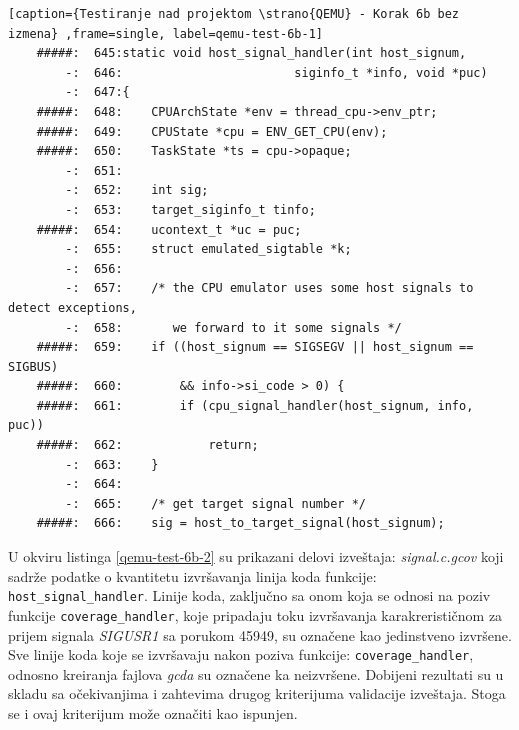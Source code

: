 \documentclass[12pt,oneside]{memoir}
\newcommand{\kod}[1]{\texttt{#1}}
\newcommand{\strano}[1]{\textit{#1}}
\begin{document}
\begin{lstlisting}[caption={Testiranje nad projektom \strano{QEMU} - Korak 6b bez izmena} ,frame=single, label=qemu-test-6b-1]
    #####:  645:static void host_signal_handler(int host_signum,
        -:  646:                        siginfo_t *info, void *puc)
        -:  647:{
    #####:  648:    CPUArchState *env = thread_cpu->env_ptr;
    #####:  649:    CPUState *cpu = ENV_GET_CPU(env);
    #####:  650:    TaskState *ts = cpu->opaque;
        -:  651:
        -:  652:    int sig;
        -:  653:    target_siginfo_t tinfo;
    #####:  654:    ucontext_t *uc = puc;
        -:  655:    struct emulated_sigtable *k;
        -:  656:
        -:  657:    /* the CPU emulator uses some host signals to detect exceptions,
        -:  658:       we forward to it some signals */
    #####:  659:    if ((host_signum == SIGSEGV || host_signum == SIGBUS)
    #####:  660:        && info->si_code > 0) {
    #####:  661:        if (cpu_signal_handler(host_signum, info, puc))
    #####:  662:            return;
        -:  663:    }
        -:  664:
        -:  665:    /* get target signal number */
    #####:  666:    sig = host_to_target_signal(host_signum);
\end{lstlisting}

U okviru listinga \ref{qemu-test-6b-2} su prikazani delovi izveštaja:
\strano{signal.c.gcov} koji sadrže podatke o kvantitetu izvršavanja linija koda funkcije: \kod{host\_signal\_handler}. Linije koda, zaključno sa onom koja se odnosi na poziv funkcije \kod{coverage\_handler}, koje pripadaju toku izvršavanja karakrerističnom za prijem signala \strano{SIGUSR1} sa porukom  45949, su označene kao jedinstveno izvršene. Sve linije koda koje se izvršavaju nakon poziva funkcije: \kod{coverage\_handler}, odnosno kreiranja fajlova \strano{gcda} su označene ka neizvršene. Dobijeni rezultati su u skladu sa očekivanjima i zahtevima drugog kriterijuma validacije izveštaja. Stoga se i ovaj kriterijum može označiti kao ispunjen. 

\newpage
\end{document}
